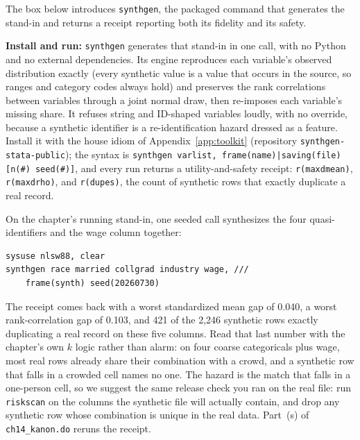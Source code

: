 The box below introduces \texttt{synthgen}, the packaged command that generates the stand-in and returns a receipt reporting both its fidelity and its safety.

\begin{kaobox}[frametitle=Package Integration: \texttt{synthgen}]
\textbf{Install and run:} \texttt{synthgen} generates that stand-in in one call, with no Python and no external dependencies. Its engine reproduces each variable's observed distribution exactly (every synthetic value is a value that occurs in the source, so ranges and category codes always hold) and preserves the rank correlations between variables through a joint normal draw, then re-imposes each variable's missing share. It refuses string and ID-shaped variables loudly, with no override, because a synthetic identifier is a re-identification hazard dressed as a feature. Install it with the house idiom of Appendix~\ref{app:toolkit} (repository \texttt{synthgen-stata-public}); the syntax is \texttt{synthgen varlist, frame(name)|saving(file) [n(\#) seed(\#)]}, and every run returns a utility-and-safety receipt: \texttt{r(maxdmean)}, \texttt{r(maxdrho)}, and \texttt{r(dupes)}, the count of synthetic rows that exactly duplicate a real record.
\end{kaobox}

On the chapter's running stand-in, one seeded call synthesizes the four quasi-identifiers and the wage column together:
\par
{\footnotesize
\begin{verbatim}
sysuse nlsw88, clear
synthgen race married collgrad industry wage, ///
    frame(synth) seed(20260730)
\end{verbatim}
}
The receipt comes back with a worst standardized mean gap of 0.040, a worst rank-correlation gap of 0.103, and 421 of the 2{,}246 synthetic rows exactly duplicating a real record on these five columns. Read that last number with the chapter's own $k$ logic rather than alarm: on four coarse categoricals plus wage, most real rows already share their combination with a crowd, and a synthetic row that falls in a crowded cell names no one. The hazard is the match that falls in a one-person cell, so we suggest the same release check you ran on the real file: run \texttt{riskscan} on the columns the synthetic file will actually contain, and drop any synthetic row whose combination is unique in the real data. Part~(s) of \texttt{ch14\_kanon.do} reruns the receipt.

